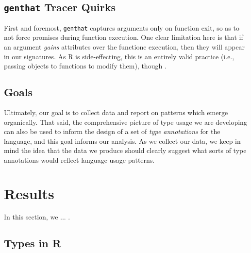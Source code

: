 \documentclass[acmsmall,10pt,review,anonymous]{acmart}\settopmatter{printfolios=true,printccs=false,printacmref=false}
\begin{document}



%
%
%
%
\subsection{{\tt genthat} Tracer Quirks}

First and foremost, {\tt genthat} captures arguments only on function exit, so as to not force promises during function execution.
 One clear limitation here is that if an argument \textit{gains} attributes over the functione execution, then they will appear in our signatures.
As R is side-effecting, this is an entirely valid practice (i.e., passing objects to functions to modify them), though .


%
%
%
%
\subsection{Goals}

Ultimately, our goal is to collect data and report on patterns which emerge organically.
That said, the comprehensive picture of type usage we are developing can also be used to inform the design of a set of \textit{type annotations} for the language, and this goal informs our analysis.
As we collect our data, we keep in mind the idea that the data we produce should clearly suggest what sorts of type annotations would reflect language usage patterns.


%
%
%
%
%
%
\section{Results}

In this section, we ... .

%
%
%
%
\subsection{Types in R}

\end{document}
